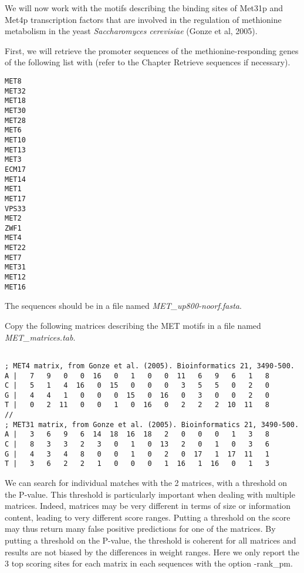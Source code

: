 We will now work with the motifs describing the binding sites of Met31p and Met4p transcription factors that are involved in the regulation of methionine metabolism in the yeast \textit{Saccharomyces cerevisiae} (Gonze et al, 2005).

First, we will retrieve the promoter sequences of the methionine-responding genes of the following list with  (refer to the Chapter Retrieve sequences if necessary).

{\color{Blue} \begin{footnotesize} 
\begin{verbatim}
MET8
MET32
MET18
MET30
MET28
MET6
MET10
MET13
MET3
ECM17
MET14
MET1
MET17
VPS33
MET2
ZWF1
MET4
MET22
MET7
MET31
MET12
MET16
\end{verbatim} \end{footnotesize}
}

The sequences should be in a file named \textit{MET\_up800-noorf.fasta}.

Copy the following matrices describing the MET motifs in a file named  \textit{MET\_matrices.tab}.

{\color{Blue} \begin{footnotesize} 
\begin{verbatim}

; MET4 matrix, from Gonze et al. (2005). Bioinformatics 21, 3490-500.
A |   7   9   0   0  16   0   1   0   0  11   6   9   6   1   8
C |   5   1   4  16   0  15   0   0   0   3   5   5   0   2   0
G |   4   4   1   0   0   0  15   0  16   0   3   0   0   2   0
T |   0   2  11   0   0   1   0  16   0   2   2   2  10  11   8
//
; MET31 matrix, from Gonze et al. (2005). Bioinformatics 21, 3490-500.
A |   3   6   9   6  14  18  16  18   2   0   0   0   1   3   8
C |   8   3   3   2   3   0   1   0  13   2   0   1   0   3   6
G |   4   3   4   8   0   0   1   0   2   0  17   1  17  11   1
T |   3   6   2   2   1   0   0   0   1  16   1  16   0   1   3
\end{verbatim} \end{footnotesize}
}

We can search for individual matches with the 2 matrices, with a threshold on the P-value. This threshold is particularly important when dealing with multiple matrices. Indeed, matrices may be very different in terms of size or information content, leading to very different score ranges. Putting a threshold on the score may thus return many false positive predictions for one of the matrices. By putting a threshold on the P-value, the threshold is coherent for all matrices and results are not biased by the differences in weight ranges. Here we only report the 3 top scoring sites for each matrix in each sequences  with the option -rank\_pm.

